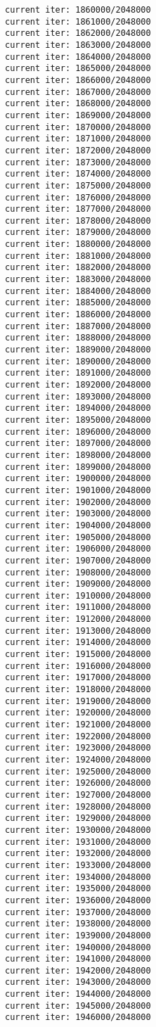 \documentclass[11pt]{article}
\begin{document}
\begin{Verbatim}[commandchars=\\\{\}]
current iter: 1860000/2048000
current iter: 1861000/2048000
current iter: 1862000/2048000
current iter: 1863000/2048000
current iter: 1864000/2048000
current iter: 1865000/2048000
current iter: 1866000/2048000
current iter: 1867000/2048000
current iter: 1868000/2048000
current iter: 1869000/2048000
current iter: 1870000/2048000
current iter: 1871000/2048000
current iter: 1872000/2048000
current iter: 1873000/2048000
current iter: 1874000/2048000
current iter: 1875000/2048000
current iter: 1876000/2048000
current iter: 1877000/2048000
current iter: 1878000/2048000
current iter: 1879000/2048000
current iter: 1880000/2048000
current iter: 1881000/2048000
current iter: 1882000/2048000
current iter: 1883000/2048000
current iter: 1884000/2048000
current iter: 1885000/2048000
current iter: 1886000/2048000
current iter: 1887000/2048000
current iter: 1888000/2048000
current iter: 1889000/2048000
current iter: 1890000/2048000
current iter: 1891000/2048000
current iter: 1892000/2048000
current iter: 1893000/2048000
current iter: 1894000/2048000
current iter: 1895000/2048000
current iter: 1896000/2048000
current iter: 1897000/2048000
current iter: 1898000/2048000
current iter: 1899000/2048000
current iter: 1900000/2048000
current iter: 1901000/2048000
current iter: 1902000/2048000
current iter: 1903000/2048000
current iter: 1904000/2048000
current iter: 1905000/2048000
current iter: 1906000/2048000
current iter: 1907000/2048000
current iter: 1908000/2048000
current iter: 1909000/2048000
current iter: 1910000/2048000
current iter: 1911000/2048000
current iter: 1912000/2048000
current iter: 1913000/2048000
current iter: 1914000/2048000
current iter: 1915000/2048000
current iter: 1916000/2048000
current iter: 1917000/2048000
current iter: 1918000/2048000
current iter: 1919000/2048000
current iter: 1920000/2048000
current iter: 1921000/2048000
current iter: 1922000/2048000
current iter: 1923000/2048000
current iter: 1924000/2048000
current iter: 1925000/2048000
current iter: 1926000/2048000
current iter: 1927000/2048000
current iter: 1928000/2048000
current iter: 1929000/2048000
current iter: 1930000/2048000
current iter: 1931000/2048000
current iter: 1932000/2048000
current iter: 1933000/2048000
current iter: 1934000/2048000
current iter: 1935000/2048000
current iter: 1936000/2048000
current iter: 1937000/2048000
current iter: 1938000/2048000
current iter: 1939000/2048000
current iter: 1940000/2048000
current iter: 1941000/2048000
current iter: 1942000/2048000
current iter: 1943000/2048000
current iter: 1944000/2048000
current iter: 1945000/2048000
current iter: 1946000/2048000

\end{Verbatim}
\end{document}
